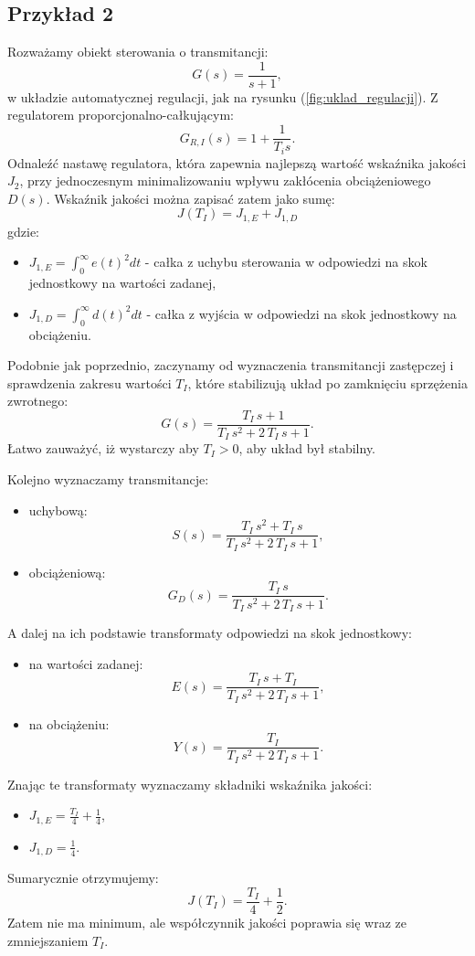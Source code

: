 \documentclass{article}
\begin{document}
    \subsection{Przykład 2}
    Rozważamy obiekt sterowania o transmitancji:
    $$
        G(s) = \frac{1}{s + 1}, 
    $$
    w układzie automatycznej regulacji, jak na rysunku (\ref{fig:uklad_regulacji}).
    Z regulatorem proporcjonalno-całkującym:
    $$
        G_{R,I}(s) = 1 + \frac{1}{T_{i}s}.
    $$
    Odnaleźć nastawę regulatora, która zapewnia najlepszą wartość wskaźnika jakości $J_{2}$, przy jednoczesnym minimalizowaniu wpływu zakłócenia obciążeniowego $D(s)$.
    Wskaźnik jakości można zapisać zatem jako sumę:
    $$
        J(T_I) = J_{1,E} + J_{1,D}
    $$
    gdzie:
    \begin{itemize}
        \item $J_{1,E} = \int_{0}^{\infty}{e(t)^2dt}$ - całka z uchybu sterowania w odpowiedzi na skok jednostkowy na wartości zadanej,
        \item $J_{1,D} = \int_{0}^{\infty}{d(t)^2dt}$ - całka z wyjścia w odpowiedzi na skok jednostkowy na obciążeniu.
    \end{itemize}


    Podobnie jak poprzednio, zaczynamy od wyznaczenia transmitancji zastępczej i sprawdzenia zakresu wartości $T_{I}$, które stabilizują układ po zamknięciu sprzężenia zwrotnego:
    $$
        G(s)
        =
        \frac{T_{I}\,s+1}{T_{I}\,s^2+2\,T_{I}\,s+1}.
    $$
    Łatwo zauważyć, iż wystarczy aby $T_{I} > 0$, aby układ był stabilny.

    Kolejno wyznaczamy transmitancje:
    \begin{itemize}
        \item uchybową:
        $$
            S(s) = \frac{T_{I}\,s^2+T_{I}\,s}{T_{I}\,s^2+2\,T_{I}\,s+1},
        $$
        \item obciążeniową:
        $$
            G_{D}(s) = \frac{T_{I}\,s}{T_{I}\,s^2+2\,T_{I}\,s+1}.
        $$
    \end{itemize}
    A dalej na ich podstawie transformaty odpowiedzi na skok jednostkowy:
    \begin{itemize}
        \item na wartości zadanej:
        $$
            E(s) = \frac{T_{I}\,s+T_{I}}{T_{I}\,s^2+2\,T_{I}\,s+1},
        $$
        \item na obciążeniu:
        $$
            Y(s) = \frac{T_{I}}{T_{I}\,s^2+2\,T_{I}\,s+1}.
        $$
    \end{itemize}
    Znając te transformaty wyznaczamy składniki wskaźnika jakości:
    \begin{itemize}
        \item $J_{1,E} = \frac{T_{I}}{4}+\frac{1}{4}$,
        \item $J_{1,D} = \frac{1}{4}$.
    \end{itemize}
    Sumarycznie otrzymujemy:
    $$
        J(T_I) = \frac{T_{I}}{4}+\frac{1}{2}.
    $$
    Zatem nie ma minimum, ale współczynnik jakości poprawia się wraz ze zmniejszaniem $T_I$. 
\end{document}
